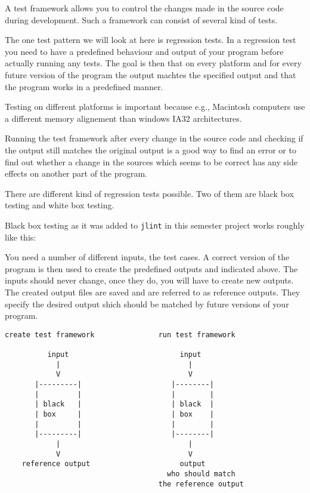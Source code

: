\documentclass[11pt,twoside,a4paper,draft]{article}
\begin{document}
A test framework allows you to control the changes made in the source code
during development. Such a framework can consist of several kind of tests.


The one test pattern we will look at here is regression tests. In a regression 
test you need to have a predefined behaviour and output of your program before
actually running any tests. The goal is then that on every platform and for every future version of the program the output machtes the specified output and that the program works in a predefined manner.


Testing on different platforms is important because e.g., Macintosh computers use a different memory alignement than windows IA32 architectures.


Running the test framework after every change in the source code and checking
if the output still matches the original output is a good way to find an error
or to find out whether a change in the sources which seems to be correct has 
any side effects on another part of the program.


There are different kind of regression tests possible. Two of them are black
box testing and white box testing.


Black box testing as it was added to \texttt{jlint} in this semester project 
works roughly like this:

You need a number of different inputs, the test cases. A correct version of the 
program is then used to create the predefined outputs and indicated above. The inputs should never change, once they do, you will have to create new outputs.
The created output files are saved and are referred to as reference outputs.
They specify the desired output shich should be matched by future versions of
your program.

\begin{verbatim}
create test framework               run test framework

          input                          input
            |                              |
            V                              V
       |---------|                     |--------|
       |         |                     |        |
       | black   |                     | black  |
       | box     |                     | box    |
       |         |                     |        |
       |---------|                     |--------|
            |                              |
            V                              V
    reference output                     output
                                      who should match
                                    the reference output
\end{verbatim}
\end{document}
